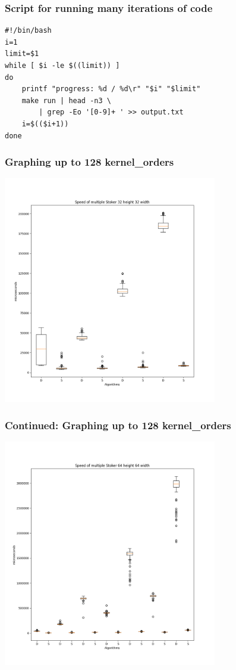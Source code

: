 \documentclass{beamer}
\begin{document}
\begin{frame}[fragile]
\frametitle{Script for running many iterations of code}
\begin{verbatim}
#!/bin/bash
i=1
limit=$1
while [ $i -le $((limit)) ]
do
    printf "progress: %d / %d\r" "$i" "$limit"
    make run | head -n3 \
        | grep -Eo '[0-9]+ ' >> output.txt
    i=$(($i+1))
done
\end{verbatim}
\end{frame}

\begin{frame}[fragile]
\frametitle{Graphing up to 128 kernel\_orders}
\includegraphics[width=0.7\textwidth]{images/Stoker-32-32}
\end{frame}

\begin{frame}[fragile]
\frametitle{Continued: Graphing up to 128 kernel\_orders}
\includegraphics[width=0.7\textwidth]{images/Stoker-64-64}
\end{frame}
\end{document}
